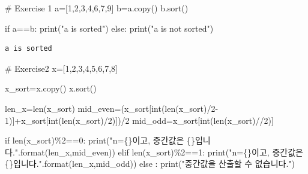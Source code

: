 \documentclass[
  letterpaper,
  DIV=11,
  numbers=noendperiod]{scrreprt}
\newenvironment{Shaded}{\begin{snugshade}}{\end{snugshade}}
\newcommand{\BuiltInTok}[1]{\textcolor[rgb]{0.00,0.23,0.31}{#1}}
\newcommand{\CommentTok}[1]{\textcolor[rgb]{0.37,0.37,0.37}{#1}}
\newcommand{\ControlFlowTok}[1]{\textcolor[rgb]{0.00,0.23,0.31}{#1}}
\newcommand{\DecValTok}[1]{\textcolor[rgb]{0.68,0.00,0.00}{#1}}
\newcommand{\NormalTok}[1]{\textcolor[rgb]{0.00,0.23,0.31}{#1}}
\newcommand{\OperatorTok}[1]{\textcolor[rgb]{0.37,0.37,0.37}{#1}}
\newcommand{\SpecialCharTok}[1]{\textcolor[rgb]{0.37,0.37,0.37}{#1}}
\newcommand{\StringTok}[1]{\textcolor[rgb]{0.13,0.47,0.30}{#1}}
\begin{document}
\begin{Shaded}
\begin{Highlighting}[]
\CommentTok{\# Exercise 1}
\NormalTok{a}\OperatorTok{=}\NormalTok{[}\DecValTok{1}\NormalTok{,}\DecValTok{2}\NormalTok{,}\DecValTok{3}\NormalTok{,}\DecValTok{4}\NormalTok{,}\DecValTok{6}\NormalTok{,}\DecValTok{7}\NormalTok{,}\DecValTok{9}\NormalTok{]}
\NormalTok{b}\OperatorTok{=}\NormalTok{a.copy()}
\NormalTok{b.sort()}

\ControlFlowTok{if}\NormalTok{ a}\OperatorTok{==}\NormalTok{b:}
    \BuiltInTok{print}\NormalTok{(}\StringTok{"a is sorted"}\NormalTok{)}
\ControlFlowTok{else}\NormalTok{:}
    \BuiltInTok{print}\NormalTok{(}\StringTok{"a is not sorted"}\NormalTok{)}
\end{Highlighting}
\end{Shaded}

\begin{verbatim}
a is sorted
\end{verbatim}

\begin{Shaded}
\begin{Highlighting}[]
\CommentTok{\# Exercise2}
\NormalTok{x}\OperatorTok{=}\NormalTok{[}\DecValTok{1}\NormalTok{,}\DecValTok{2}\NormalTok{,}\DecValTok{3}\NormalTok{,}\DecValTok{4}\NormalTok{,}\DecValTok{5}\NormalTok{,}\DecValTok{6}\NormalTok{,}\DecValTok{7}\NormalTok{,}\DecValTok{8}\NormalTok{]}

\NormalTok{x\_sort}\OperatorTok{=}\NormalTok{x.copy()}
\NormalTok{x.sort()}

\NormalTok{len\_x}\OperatorTok{=}\BuiltInTok{len}\NormalTok{(x\_sort)}
\NormalTok{mid\_even}\OperatorTok{=}\NormalTok{(x\_sort[}\BuiltInTok{int}\NormalTok{(}\BuiltInTok{len}\NormalTok{(x\_sort)}\OperatorTok{/}\DecValTok{2}\OperatorTok{{-}}\DecValTok{1}\NormalTok{)]}\OperatorTok{+}\NormalTok{x\_sort[}\BuiltInTok{int}\NormalTok{(}\BuiltInTok{len}\NormalTok{(x\_sort)}\OperatorTok{/}\DecValTok{2}\NormalTok{)])}\OperatorTok{/}\DecValTok{2}
\NormalTok{mid\_odd}\OperatorTok{=}\NormalTok{x\_sort[}\BuiltInTok{int}\NormalTok{(}\BuiltInTok{len}\NormalTok{(x\_sort)}\OperatorTok{//}\DecValTok{2}\NormalTok{)]}

\ControlFlowTok{if} \BuiltInTok{len}\NormalTok{(x\_sort)}\OperatorTok{\%}\DecValTok{2}\OperatorTok{==}\DecValTok{0}\NormalTok{:}
    \BuiltInTok{print}\NormalTok{(}\StringTok{"n=}\SpecialCharTok{\{\}}\StringTok{이고, 중간값은 }\SpecialCharTok{\{\}}\StringTok{입니다."}\NormalTok{.}\BuiltInTok{format}\NormalTok{(len\_x,mid\_even))}
\ControlFlowTok{elif} \BuiltInTok{len}\NormalTok{(x\_sort)}\OperatorTok{\%}\DecValTok{2}\OperatorTok{==}\DecValTok{1}\NormalTok{:}
    \BuiltInTok{print}\NormalTok{(}\StringTok{"n=}\SpecialCharTok{\{\}}\StringTok{이고, 중간값은 }\SpecialCharTok{\{\}}\StringTok{입니다."}\NormalTok{.}\BuiltInTok{format}\NormalTok{(len\_x,mid\_odd))}
\ControlFlowTok{else}\NormalTok{ :}
    \BuiltInTok{print}\NormalTok{(}\StringTok{"중간값을 산출할 수 없습니다."}\NormalTok{)}
\end{Highlighting}
\end{Shaded}
\end{document}
